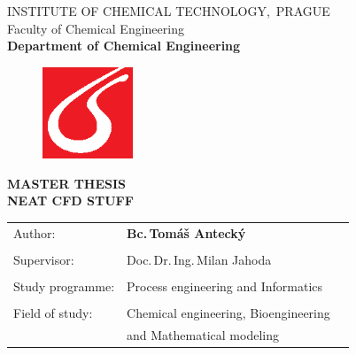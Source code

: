 \begin{center}
{\Large INSTITUTE OF CHEMICAL TECHNOLOGY,\, PRAGUE\\}
{\large Faculty of Chemical Engineering\\
\textbf{Department of Chemical Engineering}\\}
\vspace{15mm}

\begin{figure}[!h]
\begin{center}
\includegraphics[angle=0,width=27mm]{images/logo_vscht.eps}
\end{center}
\end{figure}

\vspace{25mm}

{\huge \textbf{MASTER THESIS\\}}
\vspace{10mm}
{\large \textbf{NEAT CFD STUFF\\}}
\end{center}
\vspace{15mm}

\begin{tabular}{p{50mm}lp{50mm}}
Author: & \textbf{Bc.\,Tomáš Antecký}\\
\\
Supervisor: & Doc.\,Dr.\,Ing.\,Milan Jahoda \\

\\
Study programme: & Process engineering and Informatics \\
\\
Field of study: & Chemical engineering, Bioengineering \\
	& and Mathematical modeling\\
\end{tabular}
